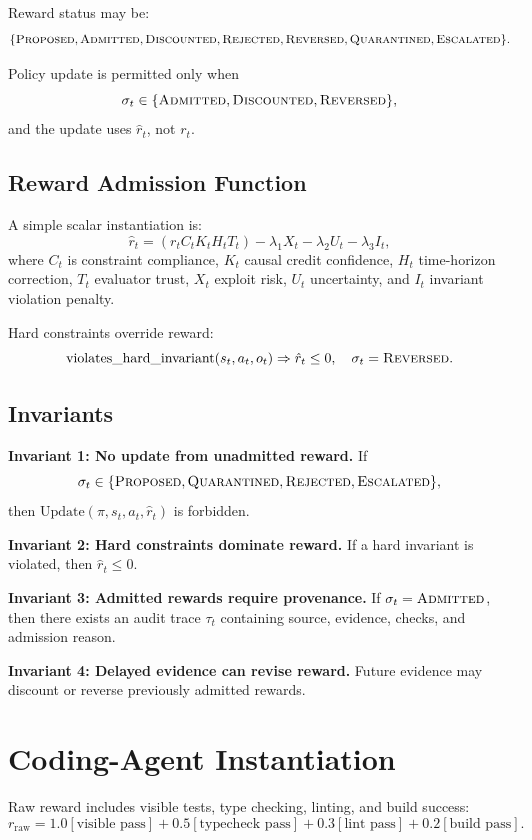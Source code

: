 \documentclass[11pt]{article}
\newcommand{\rhat}{\hat r}
\begin{document}
Reward status may be:
\[
\{\textsc{Proposed}, \textsc{Admitted}, \textsc{Discounted}, \textsc{Rejected},
\textsc{Reversed}, \textsc{Quarantined}, \textsc{Escalated}\}.
\]

Policy update is permitted only when
\[
\sigma_t \in \{\textsc{Admitted}, \textsc{Discounted}, \textsc{Reversed}\},
\]
and the update uses $\rhat_t$, not $r_t$.

\subsection{Reward Admission Function}

A simple scalar instantiation is:
\[
\rhat_t = (r_t C_t K_t H_t T_t) - \lambda_1 X_t - \lambda_2 U_t - \lambda_3 I_t,
\]
where $C_t$ is constraint compliance, $K_t$ causal credit confidence, $H_t$ time-horizon correction, $T_t$ evaluator trust, $X_t$ exploit risk, $U_t$ uncertainty, and $I_t$ invariant violation penalty.

Hard constraints override reward:
\[
\text{violates\_hard\_invariant}(s_t,a_t,o_t) \Rightarrow \rhat_t \le 0,\quad \sigma_t=\textsc{Reversed}.
\]

\subsection{Invariants}

\textbf{Invariant 1: No update from unadmitted reward.}
If
\[
\sigma_t \in \{\textsc{Proposed},\textsc{Quarantined},\textsc{Rejected},\textsc{Escalated}\},
\]
then $\text{Update}(\pi,s_t,a_t,\rhat_t)$ is forbidden.

\textbf{Invariant 2: Hard constraints dominate reward.}
If a hard invariant is violated, then $\rhat_t \le 0$.

\textbf{Invariant 3: Admitted rewards require provenance.}
If $\sigma_t=\textsc{Admitted}$, then there exists an audit trace $\tau_t$ containing source, evidence, checks, and admission reason.

\textbf{Invariant 4: Delayed evidence can revise reward.}
Future evidence may discount or reverse previously admitted rewards.

\section{Coding-Agent Instantiation}

Raw reward includes visible tests, type checking, linting, and build success:
\[
r_{\text{raw}} =
1.0[\text{visible pass}] + 0.5[\text{typecheck pass}] + 0.3[\text{lint pass}] + 0.2[\text{build pass}].
\]
\end{document}
